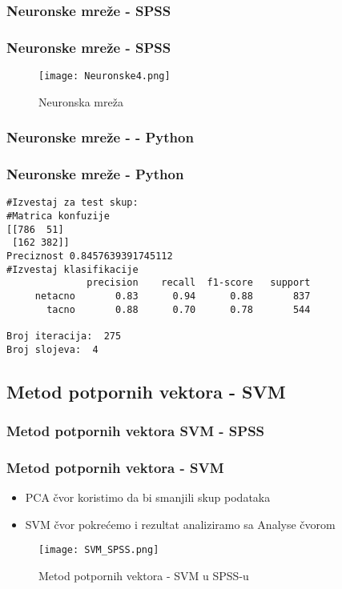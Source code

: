 \documentclass{beamer}
\begin{document}
\subsubsection*{Neuronske mreže - SPSS}
\begin{frame}[fragile]
\frametitle{Neuronske mreže - SPSS}

\begin{figure}[ht!]
    \centering
    \texttt{[image: Neuronske4.png]}
    \caption{Neuronska mreža}
    \label{fig:Neuronske1}
\end{figure}
\end{frame}

\subsubsection*{Neuronske mreže - - Python}
\begin{frame}[fragile]
\frametitle{Neuronske mreže - Python}

\begin{lstlisting}
#Izvestaj za test skup:
#Matrica konfuzije
[[786  51]
 [162 382]]
Preciznost 0.8457639391745112
#Izvestaj klasifikacije
              precision    recall  f1-score   support
     netacno       0.83      0.94      0.88       837
       tacno       0.88      0.70      0.78       544

Broj iteracija:  275
Broj slojeva:  4

\end{lstlisting}
\end{frame}


\subsection{Metod potpornih vektora - SVM}
\subsubsection*{Metod potpornih vektora SVM - SPSS}
\begin{frame}[fragile]
\frametitle{Metod potpornih vektora - SVM}
\begin{itemize}
	\item PCA čvor koristimo da bi smanjili skup podataka
	\item SVM čvor pokrećemo i rezultat analiziramo sa Analyse čvorom 
\end{itemize}
\begin{figure}
\begin{center}
\texttt{[image: SVM\_SPSS.png]}
\end{center}
\caption{Metod potpornih vektora - SVM u  SPSS-u}
\end{figure}
\end{frame}
\end{document}

